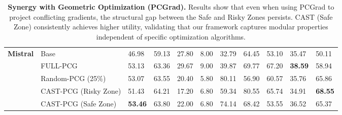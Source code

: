 \begin{table}[t]
{\begin{tabular}{cllllllllll}
\multirow{5}{*}{\textbf{Mistral}} 
 & Base & 46.98 & 59.13 & 27.80 & 8.00 & 32.79 & 64.45 & 53.10 & 35.47 & 50.11 \\
 & FULL-PCG & 53.13 & 63.36 & 29.67 & 9.00 & 39.87 & 69.77 & 67.20 & \textbf{38.59} & 58.94 \\ \cmidrule{2-11}
 & Random-PCG (25\%) & 53.07 & 63.55 & 20.40 & 5.80 & 80.11 & 56.90 & 60.57 & 35.76 & 65.86 \\
 & CAST-PCG (Risky Zone) & 51.43 & 64.21 & 17.20 & 6.80 & 59.34 & 80.55 & 65.74 & 34.91 & \textbf{68.55} \\
 & \cellcolor{pale_green}CAST-PCG (Safe Zone) & \cellcolor{pale_green}\textbf{53.46} & \cellcolor{pale_green}63.80 & \cellcolor{pale_green}22.00 & \cellcolor{pale_green}6.80 & \cellcolor{pale_green}74.14 & \cellcolor{pale_green}68.42 & \cellcolor{pale_green}53.55 & \cellcolor{pale_green}36.52 & \cellcolor{pale_green}65.37 \\ \bottomrule
\end{tabular}
}
\caption{\small
\textbf{Synergy with Geometric Optimization (PCGrad).} Results show that even when using PCGrad to project conflicting gradients, the structural gap between the Safe and Risky Zones persists. CAST (Safe Zone) consistently achieves higher utility, validating that our framework captures modular properties independent of specific optimization algorithms.}
\label{tab:pcgrad_results}
\end{table}
